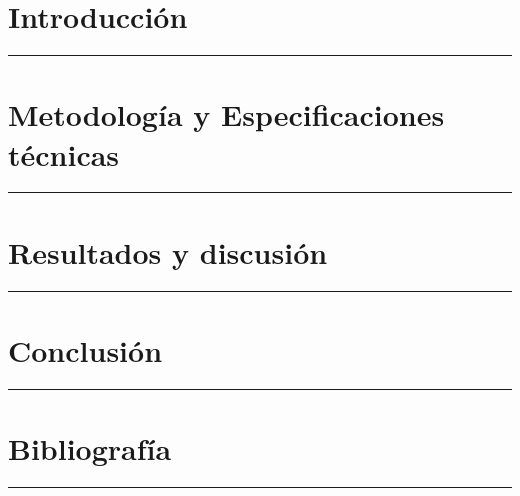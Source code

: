 \documentclass[a4paper,11pt]{article}
\newcommand{\sinmarcaagua}{
  \ClearShipoutPictureBG
}
\begin{document}
\newpage
\thispagestyle{empty}
\mbox{}
\newpage

\thispagestyle{empty}
\renewcommand{\listtablename}{Índice de tablas}
\renewcommand{\cftafterlottitle}{%
  \par\nobreak
  {\color{tfgazul}\rule{\textwidth}{3pt}}%
  \par\nobreak
}
\listoftables

\newpage
\thispagestyle{empty}
\mbox{}
\newpage

\section{Introducción}
{\color{tfgazul}\rule{\textwidth}{3pt}}


\newpage
\section{Metodología y Especificaciones técnicas}
{\color{tfgazul}\rule{\textwidth}{3pt}}


\newpage
\section{Resultados y discusión}
{\color{tfgazul}\rule{\textwidth}{3pt}}


\newpage
\section{Conclusión}
{\color{tfgazul}\rule{\textwidth}{3pt}}


\newpage
\section{Bibliografía}
{\color{tfgazul}\rule{\textwidth}{3pt}}


\renewcommand{\refname}{} 



\sinmarcaagua
\end{document}
